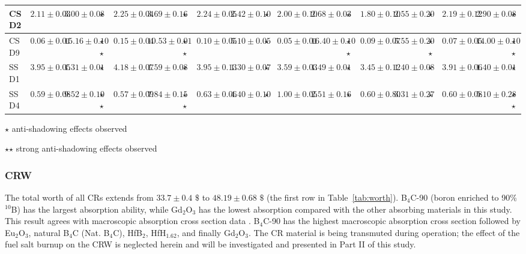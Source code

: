 \begin{sidewaystable}
\begin{tabularx}{\textwidth}{|p{1.8cm}|p{0.56cm}|p{0.5cm}|p{0.49cm}|p{0.56cm}|p{0.5cm}|p{0.49cm}| 
	p{0.56cm}|p{0.5cm}|p{0.49cm}|p{0.56cm}|p{0.5cm}|p{0.49cm}| 
	p{0.56cm}|p{0.5cm}|p{0.49cm}|p{0.56cm}|p{0.5cm}|p{0.49cm}|}
		\hline 
		CSD2			 &  $2.11\pm0.03$	&$3.00\pm0.08$	&	$\star$				& $2.25\pm0.04$   &$3.69\pm0.16$	&$\star$	&$2.24\pm0.05$	&$2.42\pm0.10$	&$\star$	&$2.00\pm0.10$	&$2.68\pm0.03$	&$\star$	&$1.80\pm0.10$	&$2.55\pm0.20$	&$\star$	&$2.19\pm0.12$	&$2.90\pm0.08$	&$\star$ \\
		\hline 
		CSD9			 &  $0.06\pm0.01$	&$15.16\pm0.10$	&	$\star$$\star$				& $0.15\pm0.04$   & $10.53\pm0.01$	&$\star$$\star$	&$0.10\pm0.05$	&$5.10\pm0.05$	&$\star$	&$0.05\pm0.01$	&$16.40\pm0.10$	&$\star$$\star$	&$0.09\pm0.07$	&$5.55\pm0.20$	&$\star$$\star$	&$0.07\pm0.05$	&$14.00\pm0.10$	&$\star$$\star$ \\ 
		\hline
		SSD1		 &  $3.95\pm0.05$	&$1.31\pm0.01$	&	$\star$		& $4.18\pm0.07$   &$1.59\pm0.08$	&$\star$	&$3.95\pm0.13$	&$1.30\pm0.07$	&$\star$	&$3.59\pm0.03$	&$1.49\pm0.01$	&$\star$	&$3.45\pm0.12$	&$1.40\pm0.08$	&$\star$	&$3.91\pm0.06$	&$1.40\pm0.01$&$\star$ \\
		\hline 
		SSD4		 &  $0.59\pm0.08$	& $9.52\pm0.10$	&	$\star$$\star$		&  $0.57\pm0.09$  &$7.84\pm0.15$	&$\star$$\star$	&$0.63\pm0.06$	&$4.40\pm0.10$	&$\star$	&$1.00\pm0.05$	&$2.51\pm0.16$	&$\star$	&$0.60\pm0.80$	&$3.31\pm0.27$	&$\star$	&$0.60\pm0.08$	&$5.10\pm0.28$	&$\star$$\star$ \\
		\hline
	\end{tabularx}
	\begin{tablenotes}
		\tiny
		\item  $\star$  anti-shadowing effects observed
		\item  $\star$$\star$ strong anti-shadowing effects observed
	\end{tablenotes}
	\label{tab:worth}
\end{sidewaystable}

\subsubsection{CRW} \label{CR_worth}

The total worth of all CRs extends from $33.7\pm0.4$ $\$$ to $48.19\pm0.68$ 
$\$$ (the first row in Table~\ref{tab:worth}). B$_4$C-90 (boron enriched to 90\% $^{10}$B)
has the largest absorption ability, while Gd$_2$O$_3$ has the lowest 
absorption compared with the other absorbing materials in this study. This 
result agrees with macroscopic absorption cross section data 
\cite{guo2019optimized}. B$_4$C-90 has the highest macroscopic 
absorption cross section followed by Eu$_2$O$_3$, natural B$_4$C (Nat. B$_4$C), HfB$_2$, HfH$_{1.62}$, and 
finally Gd$_2$O$_3$. The CR material is being transmuted during 
operation; the effect of the fuel salt burnup on the CRW is neglected
herein and will be investigated and presented in Part II of this 
study.

